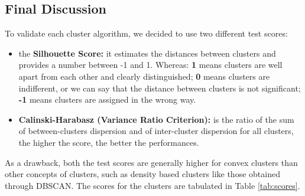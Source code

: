 \documentclass[a4paper,11pt,dvipsnames]{article}
\begin{document}
\subsection{Final Discussion}

To validate each cluster algorithm, we decided to use two different test scores:
\begin{itemize}
    \item the \textbf{Silhouette Score:} it estimates the distances between clusters and provides a number between -1 and 1. Whereas: \textbf{1} means clusters are well apart from each other and clearly distinguished; \textbf{0} means clusters are indifferent, or we can say that the distance between clusters is not significant; \textbf{-1} means clusters are assigned in the wrong way.
    \item \textbf{Calinski-Harabasz (Variance Ratio Criterion):} is the ratio of the sum of between-clusters dispersion and of inter-cluster dispersion for all clusters, the higher the score, the better the performances.
\end{itemize}

As a drawback, both the test scores are generally higher for convex clusters than other concepts of clusters, such as density based clusters like those obtained through DBSCAN. The scores for the clusters are tabulated in Table \ref{tab:scores}.

\begin{table}[h]
    \centering
    \caption{Evaluation of different test scores for the type of analyzed cluster algorithms}
    \label{tab:scores}
\end{table}
\end{document}
